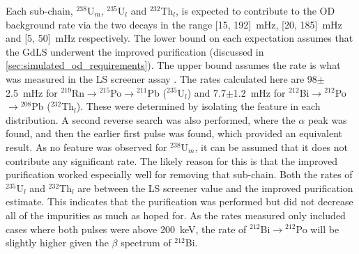 \par
Each sub-chain, ${}^{238}$U$_{m}$, ${}^{235}$U$_{l}$ and ${}^{232}$Th$_{l}$, is expected to contribute to the OD background rate via the two decays in the range [15, 192]~mHz, [20, 185]~mHz and [5, 50]~mHz respectively.
The lower bound on each expectation assumes that the GdLS underwent the improved purification (discussed in \autoref{sec:simulated_od_requirements}).
The upper bound assumes the rate is what was measured in the LS screener assay \cite{scotthaselschwardt_thesis_ref}.
The rates calculated here are 98$\pm$2.5~mHz for ${}^{219}$Rn$\to{}^{215}$Po$\to{}^{211}$Pb (${}^{235}$U$_{l}$) and 7.7$\pm$1.2~mHz for ${}^{212}$Bi$\to{}^{212}$Po$\to{}^{208}$Pb (${}^{232}$Th$_{l}$).
These were determined by isolating the feature in each distribution.
A second reverse search was also performed, where the $\alpha$ peak was found, and then the earlier first pulse was found, which provided an equivalent result.
As no feature was observed for ${}^{238}$U$_{m}$, it can be assumed that it does not contribute any significant rate.
The likely reason for this is that the improved purification worked especially well for removing that sub-chain.
Both the rates of ${}^{235}$U$_{l}$ and ${}^{232}$Th$_{l}$ are between the LS screener value and the improved purification estimate.
This indicates that the purification was performed but did not decrease all of the impurities as much as hoped for.
As the rates measured only included cases where both pulses were above 200~keV, the rate of ${}^{212}$Bi$\to{}^{212}$Po will be slightly higher given the $\beta$ spectrum of ${}^{212}$Bi. 

